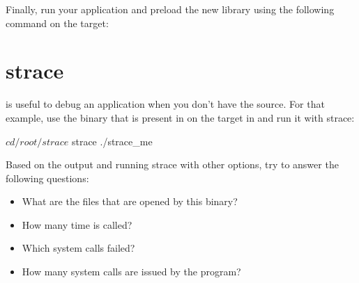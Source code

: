 Finally, run your application and preload the new library using the following
command on the target:

\section{strace}

 is useful to debug an application when you don't have the source.
For that example, use the  binary that is present in on the
target in  and run it with strace:

\begin{bashinput}
$ cd /root/strace
$ strace ./strace_me
\end{bashinput}

Based on the output and running strace with other options, try to answer the
following questions:
\begin{itemize}
  \item What are the files that are opened by this binary?
  \item How many time is  called?
  \item Which  system calls failed?
  \item How many system calls are issued by the program?
\end{itemize}
